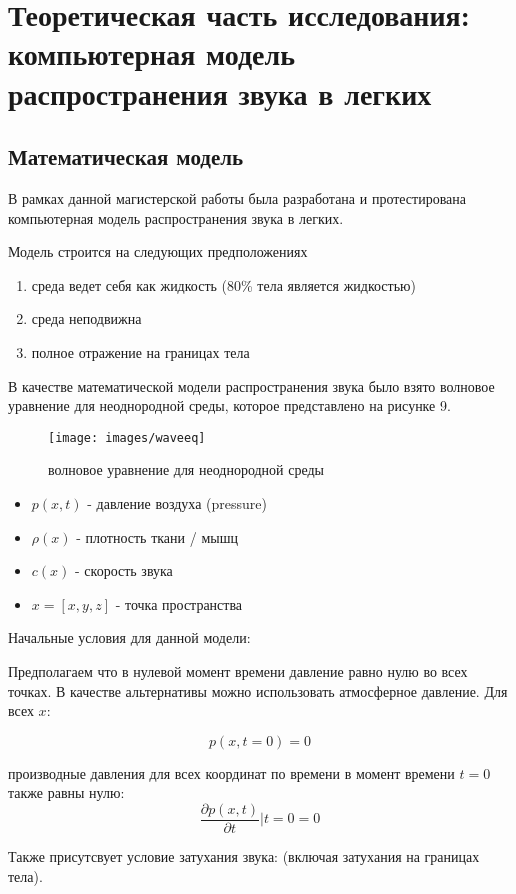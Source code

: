 \documentclass[../main.tex]{subfiles}
\begin{document}
\section{Теоретическая часть исследования: компьютерная модель распространения звука в легких}
\subsection{Математическая модель}
В рамках данной магистерской работы была разработана и протестирована компьютерная модель распространения звука в легких.

Модель строится на следующих предположениях
\begin{enumerate}
    \item среда ведет себя как жидкость (80\% тела является жидкостью)
    \item среда неподвижна
    \item полное отражение на границах тела
\end{enumerate}

В качестве математической модели распространения звука было взято волновое уравнение для неоднородной среды, которое представлено на рисунке 9.

\begin{figure}[H]
\centering
\texttt{[image: images/waveeq]}
\caption{волновое уравнение для неоднородной среды}
\end{figure}

\begin{itemize}
    \item $p(x, t)$ - давление воздуха (pressure)
    \item $\rho(x)$ - плотность ткани / мышц
    \item $c(x)$ - скорость звука
    \item $x = [x, y, z]$ - точка пространства
\end{itemize}

Начальные условия для данной модели:

Предполагаем что в нулевой момент времени давление равно нулю во всех точках. В качестве альтернативы можно использовать атмосферное давление. Для всех $x$:

$$p(x, t=0) = 0$$

производные давления для всех координат по времени в момент времени $t=0$ также равны нулю:
$$\frac{\partial p(x, t)}{\partial t} \rvert t=0 = 0$$

Также присутсвует условие затухания звука: (включая затухания на границах тела).
\end{document}
